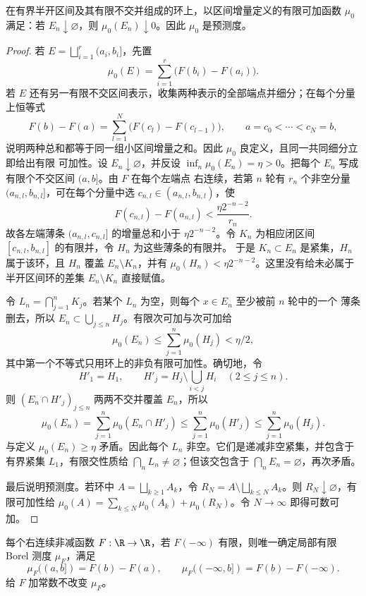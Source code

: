 \begin{lemma}\label{lem:stieltjes-continuity-at-empty}
在有界半开区间及其有限不交并组成的环上，以区间增量定义的有限可加函数 $\mu_0$ 满足：若
$E_n\downarrow\varnothing$，则 $\mu_0(E_n)\downarrow0$。因此 $\mu_0$ 是预测度。
\end{lemma}

\begin{proof}
若 $E=\bigsqcup_{i=1}^r(a_i,b_i]$，先置
\[
 \mu_0(E)=\sum_{i=1}^r\bigl(F(b_i)-F(a_i)\bigr).
\]
若 $E$ 还有另一有限不交区间表示，收集两种表示的全部端点并细分；在每个分量上恒等式
\[
 F(b)-F(a)=\sum_{l=1}^N\bigl(F(c_l)-F(c_{l-1})\bigr),
 \qquad a=c_0<\cdots<c_N=b,
\]
说明两种总和都等于同一组小区间增量之和。因此 $\mu_0$ 良定义，且同一共同细分立即给出有限
可加性。设
$E_n\downarrow\varnothing$，并反设
$\inf_n\mu_0(E_n)=\eta>0$。把每个 $E_n$ 写成有限个不交区间 $(a,b]$。由 $F$ 在每个左端点
右连续，若第 $n$ 轮有 $r_n$ 个非空分量 $(a_{n,l},b_{n,l}]$，可在每个分量中选
$c_{n,l}\in(a_{n,l},b_{n,l})$，使
\[
 F(c_{n,l})-F(a_{n,l})<\frac{\eta2^{-n-2}}{r_n}.
\]
故各左端薄条 $(a_{n,l},c_{n,l}]$ 的增量总和小于 $\eta2^{-n-2}$。令 $K_n$ 为相应闭区间
$[c_{n,l},b_{n,l}]$ 的有限并，令 $H_n$ 为这些薄条的有限并。
于是 $K_n\subset E_n$ 是紧集，$H_n$ 属于该环，且 $H_n$ 覆盖 $E_n\setminus K_n$，并有
$\mu_0(H_n)<\eta2^{-n-2}$。这里没有给未必属于半开区间环的差集
$E_n\setminus K_n$ 直接赋值。

令 $L_n=\bigcap_{j=1}^nK_j$。若某个 $L_n$ 为空，则每个 $x\in E_n$ 至少被前 $n$ 轮中的一个
薄条删去，所以 $E_n\subset\bigcup_{j\le n}H_j$。有限次可加与次可加给
\[
 \mu_0(E_n)\le\sum_{j=1}^n\mu_0(H_j)<\eta/2,
\]
其中第一个不等式只用环上的非负有限可加性。确切地，令
\[
 H'_1=H_1,
 \qquad H'_j=H_j\setminus\bigcup_{i<j}H_i\quad(2\le j\le n).
\]
则 $(E_n\cap H'_j)_{j\le n}$ 两两不交并覆盖 $E_n$，所以
\[
 \mu_0(E_n)=\sum_{j=1}^n\mu_0(E_n\cap H'_j)
 \le\sum_{j=1}^n\mu_0(H'_j)
 \le\sum_{j=1}^n\mu_0(H_j).
\]
与定义 $\mu_0(E_n)\ge\eta$ 矛盾。因此每个 $L_n$ 非空。它们是递减非空紧集，并包含于有界紧集
$L_1$，有限交性质给
$\bigcap_nL_n\ne\varnothing$；但该交包含于 $\bigcap_nE_n=\varnothing$，再次矛盾。

最后说明预测度。若环中 $A=\bigsqcup_{k\ge1}A_k$，令
$R_N=A\setminus\bigsqcup_{k\le N}A_k$。则 $R_N\downarrow\varnothing$，有限可加性给
$\mu_0(A)=\sum_{k\le N}\mu_0(A_k)+\mu_0(R_N)$。令 $N\to\infty$ 即得可数可加。
\end{proof}

\begin{theorem}\label{theorem:2-3-3-2}
每个右连续非减函数 $F:\R\to\R$，若 $F(-\infty)$ 有限，则唯一确定局部有限 Borel 测度
$\mu_F$，满足
\[
 \mu_F((a,b])=F(b)-F(a),\qquad
 \mu_F(( -\infty,b])=F(b)-F(-\infty).
\]
给 $F$ 加常数不改变 $\mu_F$。
\end{theorem}

